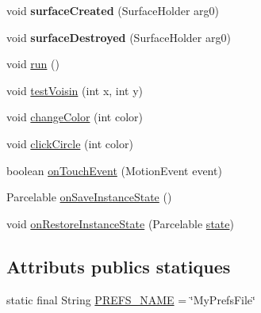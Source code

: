 \begin{DoxyCompactItemize}
\item 
\hypertarget{classp8_1_1demo_1_1colorflood_1_1_color_flood_view_a2d67d0a5b8d4bb83b698e517f3883d53}{}void {\bfseries surface\+Created} (Surface\+Holder arg0)\label{classp8_1_1demo_1_1colorflood_1_1_color_flood_view_a2d67d0a5b8d4bb83b698e517f3883d53}

\item 
\hypertarget{classp8_1_1demo_1_1colorflood_1_1_color_flood_view_a21bd9618fd8febc1ac9218afb61e8cf9}{}void {\bfseries surface\+Destroyed} (Surface\+Holder arg0)\label{classp8_1_1demo_1_1colorflood_1_1_color_flood_view_a21bd9618fd8febc1ac9218afb61e8cf9}

\item 
void \hyperlink{classp8_1_1demo_1_1colorflood_1_1_color_flood_view_ac36fac9e9c09e4ce941f34dc5e88a339}{run} ()
\item 
void \hyperlink{classp8_1_1demo_1_1colorflood_1_1_color_flood_view_a816914982568d39c00fd585b57df2d26}{test\+Voisin} (int x, int y)
\item 
void \hyperlink{classp8_1_1demo_1_1colorflood_1_1_color_flood_view_a6ec591cc35c1d2d3b58376f7ab843adf}{change\+Color} (int color)
\item 
void \hyperlink{classp8_1_1demo_1_1colorflood_1_1_color_flood_view_ac4be93ac702ce5142f93b4670e1e0e60}{click\+Circle} (int color)
\item 
boolean \hyperlink{classp8_1_1demo_1_1colorflood_1_1_color_flood_view_a033731c2d315d3aecadc578fa2648438}{on\+Touch\+Event} (Motion\+Event event)
\item 
Parcelable \hyperlink{classp8_1_1demo_1_1colorflood_1_1_color_flood_view_a77325bff94dd30de94b10af41846ca03}{on\+Save\+Instance\+State} ()
\item 
void \hyperlink{classp8_1_1demo_1_1colorflood_1_1_color_flood_view_a1b4e4c683f66ab8bf16f72453b8c8ff0}{on\+Restore\+Instance\+State} (Parcelable \hyperlink{classp8_1_1demo_1_1colorflood_1_1_color_flood_view_a5666b3002546f071f8e503c009608259}{state})
\end{DoxyCompactItemize}
\subsection*{Attributs publics statiques}
\begin{DoxyCompactItemize}
\item 
static final String \hyperlink{classp8_1_1demo_1_1colorflood_1_1_color_flood_view_a4d0c7b140ad6fef18d29c6fc088b6471}{P\+R\+E\+F\+S\+\_\+\+N\+A\+M\+E} = \char`\"{}My\+Prefs\+File\char`\"{}
\end{DoxyCompactItemize}


